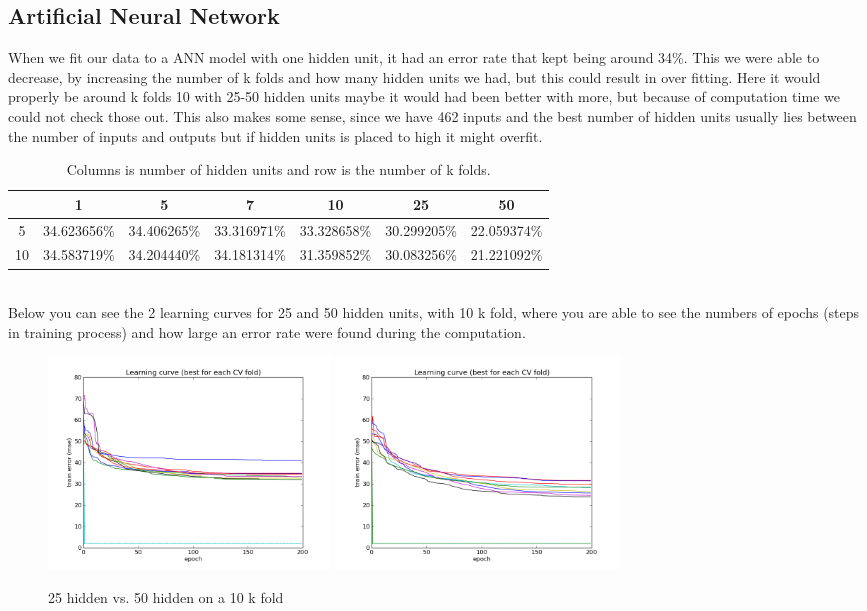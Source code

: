 \subsection{Artificial Neural Network}

When we fit our data to a ANN model with one hidden unit, it had an error rate that kept being around 34\%. This we were able to decrease, by increasing the number of k folds and how many hidden units we had, but this could result in over fitting. Here it would properly be around k folds 10 with 25-50 hidden units maybe it would had been better with more, but because of computation time we could not check those out. This also makes some sense, since we have 462 inputs and the best number of hidden units usually lies between the number of inputs and outputs but if hidden units is placed to high it might overfit.
\begin{table}[!h]
\begin{longtable}{ccccccc}
\hline 
   & 1 			 & 5 		   & 7 			 & 10		   & 25			 & 50 \\ \hline
5  & 34.623656\% & 34.406265\% & 33.316971\% & 33.328658\% & 30.299205\% & 22.059374\% \\ 
10 & 34.583719\% & 34.204440\% & 34.181314\% & 31.359852\% & 30.083256\% & 21.221092\% \\ \hline 
\end{longtable}
\caption{Columns is number of hidden units and row is the number of k folds.}
\end{table}
\\
Below you can see the 2 learning curves for 25 and 50 hidden units, with 10 k fold, where you are able to see the numbers of epochs (steps in training process) and how large an error rate were found during the computation.
\begin{figure}[!h]
\centering
\includegraphics[width=7.5cm, keepaspectratio=true]{pictures/ann_1_10_25.png}
\includegraphics[width=7.5cm, keepaspectratio=true]{pictures/ann_1_10_50.png}
\vspace{-0.4cm}
\caption{\footnotesize 25 hidden vs. 50 hidden on a 10 k fold}
\label{full_10_25_50}
\end{figure}

